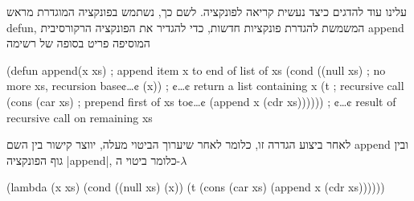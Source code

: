 עלינו עוד להדגים כיצד נעשית קריאה לפונקציה. לשם כך, נשתמש בפונקציה המוגדרת מראש
defun, המשמשת להגדרת פונקציות חדשות, כדי להגדיר את הפונקציה הרקורסיבית append
המוסיפה פריט בסופה של רשימה \begin{LISP}
(defun append(x xs) ; append item x to end of list of xs
  (cond ((null xs) ; no more xs, recursion base¢…¢
          (x)) ; ¢…¢ return a list containing x
        (t ; recursive call
          (cons
            (car xs) ; prepend first of xs to¢…¢
            (append x (cdr xs)))))) ; ¢…¢ result of recursive call on remaining xs
\end{LISP}

לאחר ביצוע הגדרה זו, כלומר לאחר שיערוך הביטוי מעלה, יווצר קישור בין השם append
ובין גוף הפונקציה \E|append|, כלומר ביטוי ה-$λ$
\begin{LISP}
(lambda (x xs)
  (cond ((null xs) (x))
        (t (cons
              (car xs)
              (append x (cdr xs))))))
\end{LISP}

